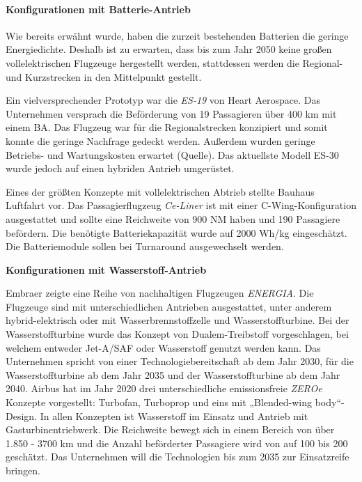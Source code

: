 \paragraph{Konfigurationen mit Batterie-Antrieb}
Wie bereits erwähnt wurde, haben die zurzeit bestehenden Batterien die geringe Energiedichte. 
Deshalb ist zu erwarten, dass bis zum Jahr 2050 keine großen vollelektrischen Flugzeuge hergestellt werden, 
stattdessen werden die Regional- und Kurzstrecken in den Mittelpunkt gestellt.

Ein vielversprechender Prototyp war die \textit{ES-19} von Heart Aerospace. 
Das Unternehmen versprach die Beförderung von 19 Passagieren über 400 km mit einem BA. 
Das Flugzeug war für die Regionalstrecken konzipiert und 
somit konnte die geringe Nachfrage gedeckt werden. 
Außerdem wurden geringe Betriebs- und Wartungskosten erwartet (Quelle).
Das aktuellste Modell ES-30 wurde jedoch auf einen hybriden Antrieb umgerüstet.

Eines der größten Konzepte mit vollelektrischen Abtrieb stellte Bauhaus Luftfahrt vor. 
Das Passagierflugzeug \textit{Ce-Liner} \cite{BauhausLuftfahrt} ist mit einer C-Wing-Konfiguration
ausgestattet und sollte eine Reichweite von 900 NM haben und 190 Passagiere befördern. 
Die benötigte Batteriekapazität wurde auf 2000 Wh/kg eingeschätzt. 
Die Batteriemodule sollen bei Turnaround ausgewechselt werden.


\textbf{Konfigurationen mit Wasserstoff-Antrieb}

Embraer zeigte eine Reihe von nachhaltigen Flugzeugen \textit{ENERGIA}. 
Die Flugzeuge sind mit unterschiedlichen Antrieben ausgestattet, 
unter anderem hybrid-elektrisch oder mit Wasserbrennstoffzelle und Wasserstoffturbine. 
Bei der Wasserstoffturbine wurde das Konzept von Dualem-Treibstoff vorgeschlagen, 
bei welchem entweder Jet-A/SAF oder Wasserstoff genutzt werden kann. 
Das Unternehmen spricht von einer Technologiebereitschaft ab dem Jahr 2030, 
für die Wasserstoffturbine ab dem Jahr 2035 und der Wasserstoffturbine ab dem Jahr 2040. \cite{embraer_energia_2021}
%
Airbus \cite{airbus_zea_concepts} hat im Jahr 2020 drei unterschiedliche 
emissionsfreie \textit{ZEROe} Konzepte vorgestellt: Turbofan, Turboprop und eins mit „Blended-wing body“-Design.
In allen Konzepten ist Wasserstoff im Einsatz und Antrieb mit Gasturbinentriebwerk. 
Die Reichweite bewegt sich in einem Bereich von über 1.850 - 3700 km 
und die Anzahl beförderter Passagiere wird von auf 100 bis 200 geschätzt. 
Das Unternehmen will die Technologien bis zum 2035 zur Einsatzreife bringen.

